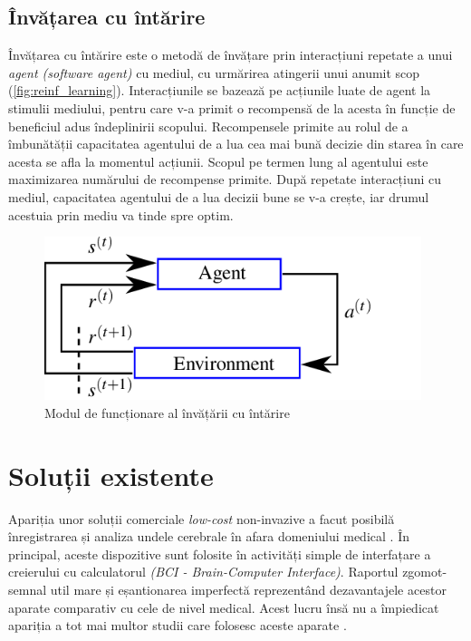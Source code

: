\subsection*{Învățarea cu întărire}
Învățarea cu întărire este o metodă de învățare prin interacțiuni repetate a unui \textit{agent (software agent)} cu mediul, cu urmărirea atingerii unui anumit scop (\autoref*{fig:reinf_learning}). Interacțiunile se bazează pe acțiunile luate de agent la stimulii mediului, pentru care v-a primit o recompensă de la acesta în funcție de beneficiul adus îndeplinirii scopului. Recompensele primite au rolul de a îmbunătății capacitatea agentului de a lua cea mai bună decizie din starea în care acesta se afla la momentul acțiunii. Scopul pe termen lung al agentului este maximizarea numărului de recompense primite. După repetate interacțiuni cu mediul, capacitatea agentului de a lua decizii bune se v-a crește, iar drumul acestuia prin mediu va tinde spre optim.
\begin{figure}[ht]
	\center
	\includegraphics[width=11cm, keepaspectratio]{fig/cap1/The-reinforcement-learning-paradigm-consists-of-an-agent-interacting-with-an.png}
	\caption{Modul de funcționare al învățării cu întărire \cite{fig:reinforcement}}
	\label{fig:reinf_learning}
\end{figure}

\section{Soluții existente}
Apariția unor soluții comerciale \textit{low-cost} non-invazive a facut posibilă înregistrarea și analiza undele cerebrale în afara domeniului medical \cite{online:emotiv}. În principal, aceste dispozitive sunt folosite în activități simple de interfațare a creierului cu calculatorul \textit{(BCI - Brain-Computer Interface)}. Raportul zgomot-semnal util mare și eșantionarea imperfectă reprezentând dezavantajele acestor aparate comparativ cu cele de nivel medical. Acest lucru însă nu a împiedicat apariția a tot mai multor studii care folosesc aceste aparate \cite{consumer-eeg:2018}.

